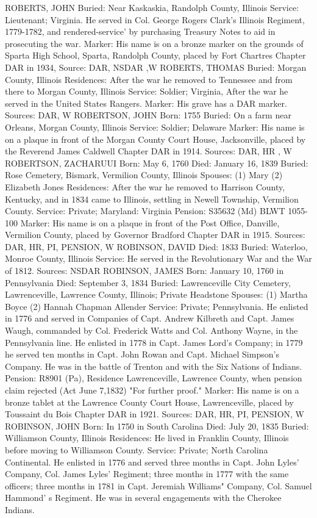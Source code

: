 ROBERTS, JOHN 
Buried: Near Kaskaskia, Randolph County, Illinois
Service: Lieutenant; Virginia. He served in Col. George Rogers Clark's Illinois Regiment, 1779-1782, and rendered-service' by purchasing Treasury Notes to aid in prosecuting the war.
Marker: His name is on a bronze marker on the grounds of Sparta High School, Sparta, Randolph County, placed by Fort Chartres Chapter DAR in 1934, 
Source: DAR, NSDAR ,W 
ROBERTS, THOMAS 
Buried: Morgan County, Illinois
Residences: After the war he removed to Tennessee and from there to Morgan 
County, Illinois
Service: Soldier; Virginia, After the war he served in the United States Rangers.
Marker: His grave has a DAR marker.
Sources: DAR, W 
ROBERTSON, JOHN
Born: 1755
Buried: On a farm near Orleans, Morgan County, Illinois
Service: Soldier; Delaware
Marker: His name is on a plaque in front of the Morgan County Court House, Jacksonville, placed by the Reverend James Caldwell Chapter DAR in 1914.
Sources: DAR, HR , W 
ROBERTSON, ZACHARUUI
Born: May 6, 1760 
Died: January 16, 1839
Buried: Rose Cemetery, Bismark, Vermilion County, Illinois
Spouses:  (1) Mary 
	(2) Elizabeth Jones
Residences: After the war he removed to Harrison County, Kentucky, and in 1834 came to Illinois, settling in Newell Township, Vermilion County.
Service: Private; Maryland: Virginia 
Pension: S35632 (Md) BLWT 1055-100
Marker: His name is on a plaque in front of the Post Office, Danville, Vermilion County, placed by Governor Bradford Chapter DAR in 1915.
Sources: DAR, HR, PI, PENSION, W 
ROBINSON, DAVID
Died: 1833
Buried: Waterloo, Monroe County, Illinois
Service: He served in the Revolutionary War and the War of 1812.
Sources: NSDAR 
ROBINSON, JAMES
Born: January 10, 1760 in Pennsylvania
Died: September 3, 1834
Buried: Lawrenceville City Cemetery, Lawrenceville, Lawrence County, Illinois; 
Private Headstone
Spouses:  (1) Martha Boyce 
	(2) Hannah Chapman Allender 
Service: Private; Pennsylvania. He enlisted in 1776 and served in Companies of Capt. Andrew Kilbreth and Capt. James Waugh, commanded by Col. Fred­erick Watts and Col. Anthony Wayne, in the Pennsylvania line. He enlisted in 1778 in Capt. James Lord's Company; in 1779 he served ten months in Capt. John Rowan and Capt. Michael Simpson's Company. He was in the battle of Trenton and with the Six Nations of Indians. 
Pension: R8901 (Pa), Residence Lawrenceville, Lawrence County, when pension claim rejected (Act June 7,1832) "For further proof." 
Marker: His name is on a bronze tablet at the Lawrence County Court House, Lawrenceville, placed by Toussaint du Bois Chapter DAR in 1921.
Sources: DAR, HR, PI, PENSION, W 
ROBINSON, JOHN
Born: In 1750 in South Carolina
Died: July 20, 1835 
Buried: Williamson County, Illinois 
Residences: He lived in Franklin County, Illinois before moving to Williamson County. 
Service: Private; North Carolina Continental. He enlisted in 1776 and served three months in Capt. John Lyles' Company, Col. James Lyles' Regiment; three months in 1777 with the same officers; three months in 1781 in Capt. Jeremiah Williams" Company, Col. Samuel Hammond' s Regiment. He was in several engagements with the Cherokee Indians. 

